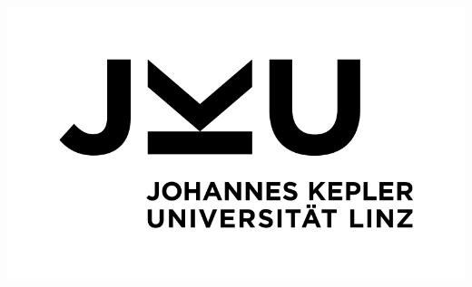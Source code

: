 \documentclass[a1paper, portrait,innermargin=10mm, blockverticalspace=10mm, colspace=10mm,margin=0mm,]{tikzposter} %
\begin{document}
\begin{columns}
{\begin{minipage}[t]{0.33\colwidth}
\begin{center}
	\includegraphics[scale=0.2]{logos/JKU.png}
	\end{center}
\end{minipage}
}
\end{columns}
\end{document}
